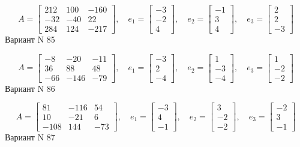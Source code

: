 \documentclass[11pt]{report}
\begin{document}
$$A = \left[\begin{matrix}212 & 100 & -160\\-32 & -40 & 22\\284 & 124 & -217\end{matrix}\right],\quad e_1 = \left[\begin{matrix}-3\\-2\\4\end{matrix}\right],\quad e_2 = \left[\begin{matrix}-1\\3\\4\end{matrix}\right],\quad e_3 = \left[\begin{matrix}2\\2\\-3\end{matrix}\right]$$Вариант N 85

$$A = \left[\begin{matrix}-8 & -20 & -11\\36 & 88 & 48\\-66 & -146 & -79\end{matrix}\right],\quad e_1 = \left[\begin{matrix}-3\\2\\-4\end{matrix}\right],\quad e_2 = \left[\begin{matrix}1\\-3\\-4\end{matrix}\right],\quad e_3 = \left[\begin{matrix}1\\-2\\-2\end{matrix}\right]$$Вариант N 86

$$A = \left[\begin{matrix}81 & -116 & 54\\10 & -21 & 6\\-108 & 144 & -73\end{matrix}\right],\quad e_1 = \left[\begin{matrix}-3\\4\\-1\end{matrix}\right],\quad e_2 = \left[\begin{matrix}3\\-2\\-2\end{matrix}\right],\quad e_3 = \left[\begin{matrix}-2\\3\\-1\end{matrix}\right]$$Вариант N 87
\end{document}
